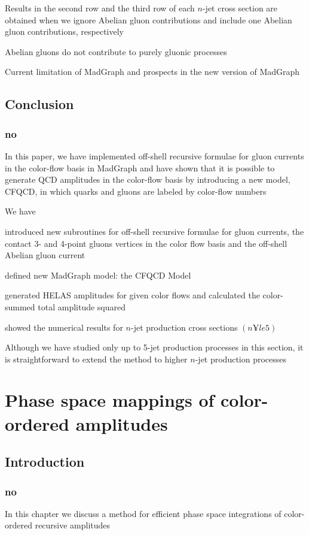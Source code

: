 \documentclass{book}
\begin{document}
Results in the second row and the third row of each $n$-jet cross section are obtained when we ignore Abelian gluon contributions and include one Abelian gluon contributions, respectively

Abelian gluons do not contribute to purely gluonic processes

Current limitation of MadGraph and prospects in the new version of MadGraph

\section{Conclusion}
\subsection{no}
 In this paper, we have implemented off-shell recursive formulae for gluon currents in the color-flow basis in MadGraph and have shown that it is possible to generate QCD amplitudes in the color-flow basis by introducing a new model, CFQCD, in which quarks and gluons are labeled by color-flow numbers

We have

introduced new subroutines for off-shell recursive formulae for gluon currents, the contact 3- and 4-point gluons vertices in the color flow basis and the off-shell Abelian gluon current

defined new MadGraph model: the CFQCD Model

generated HELAS amplitudes for given color flows and calculated the color-summed total amplitude squared

showed the numerical results for $n$-jet production cross sections $(n¥le 5)$

Although we have studied only up to 5-jet production processes in this section, it is straightforward to extend the method to higher $n$-jet production processes

\chapter{Phase space mappings of color-ordered amplitudes}
\section{Introduction}
\subsection{no}
In this chapter we discuss a method for efficient phase space integrations of color-ordered recursive amplitudes
\end{document}
